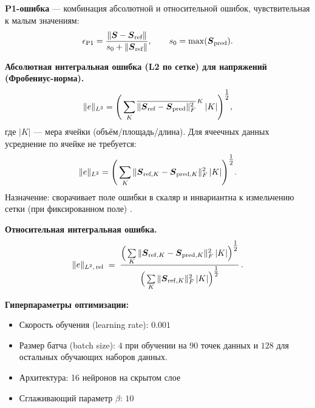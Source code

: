 \textbf{P1-ошибка} \cite{xie2024p1} — комбинация абсолютной и относительной ошибок, чувствительная к малым значениям:
\begin{equation}\label{eq:p1_error}
  \epsilon_{\mathrm{P1}} = \frac{\| \boldsymbol{S} - \boldsymbol{S}_{\text{ref}} \|}{s_0 + \| \boldsymbol{S}_{\text{ref}} \|},\qquad s_0 = \max(\boldsymbol{S}_{\text{pred}}).
\end{equation}

\textbf{Абсолютная интегральная ошибка (L2 по сетке) для напряжений (Фробениус-норма).}
\begin{equation}\label{eq:l2_abs_stress}
  \|e\|_{L^2} = \Bigg( \sum_{K} \overline{\| \boldsymbol{S}_{\text{ref}} - \boldsymbol{S}_{\text{pred}} \|_F^{2}}^{\,K}\, |K| \Bigg)^{\tfrac12},
\end{equation}
где $|K|$ — мера ячейки (объём/площадь/длина). Для ячеечных данных усреднение по ячейке не требуется:
\begin{equation}\label{eq:l2_abs_stress_cell}
  \|e\|_{L^2} = \Bigg( \sum_{K} \| \boldsymbol{S}_{\text{ref},K} - \boldsymbol{S}_{\text{pred},K} \|_F^{2}\, |K| \Bigg)^{\tfrac12}.
\end{equation}
Назначение: сворачивает поле ошибки в скаляр и инвариантна к измельчению сетки (при фиксированном поле) \cite{BrennerScott2008,AinsworthOden2000,Verfurth2013}.

\textbf{Относительная интегральная ошибка.}
\begin{equation}\label{eq:l2_rel_stress}
  \|e\|_{L^2,\,\mathrm{rel}}\;=\; \frac{\Big( \sum\limits_{K} 
  \| \boldsymbol{S}_{\mathrm{ref},K} - \boldsymbol{S}_{\mathrm{pred},K} \|_F^{2}\, |K| \Big)^{\tfrac12}}
  {\Big( \sum\limits_{K} \| \boldsymbol{S}_{\mathrm{ref},K} \|_F^{2}\, |K| \Big)^{\tfrac12}}\,.
\end{equation}


\textbf{Гиперпараметры оптимизации:}
\begin{itemize}
  \item Скорость обучения (learning rate): $0.001$
  \item Размер батча (batch size): $4$ при обучении на 90 точек данных и $128$ для остальных обучающих наборов данных.
  \item Архитектура: 16 нейронов на скрытом слое
  \item Сглаживающий параметр $\beta$: $10$
\end{itemize}

